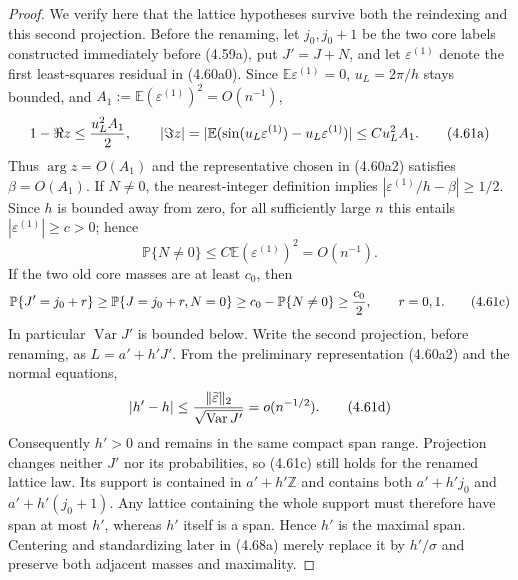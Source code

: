 \documentclass[11pt,a4paper]{article}
\numberwithin{equation}{section}
\theoremstyle{definition}
\theoremstyle{remark}
\newcommand{\E}{\mathbb E}
\newcommand{\Pp}{\mathbb P}
\begin{document}
\begin{proof}
We verify here that the lattice hypotheses survive both the reindexing and
this second projection.  Before the renaming, let $j_0,j_0+1$ be the two
core labels constructed immediately before (4.59a), put $J'=J+N$, and let
$\varepsilon^{(1)}$ denote
the first least-squares residual in (4.60a0).  Since
$\E\varepsilon^{(1)}=0$, $u_L=2\pi/h$ stays bounded, and
$A_1:=\E(\varepsilon^{(1)})^2=O(n^{-1})$,
\[
 1-\Re z\le {u_L^2A_1\over2},\qquad
 |\Im z|=|\E(\sin(u_L\varepsilon^{(1)})
                    -u_L\varepsilon^{(1)})|
       \le C u_L^2A_1.                                \tag{4.61a}
\]
Thus $\arg z=O(A_1)$ and the representative chosen in (4.60a2) satisfies
$\beta=O(A_1)$.  If $N\ne0$, the nearest-integer definition implies
$|\varepsilon^{(1)}/h-\beta|\ge1/2$.  Since $h$ is bounded away from
zero, for all sufficiently large $n$ this entails
$|\varepsilon^{(1)}|\ge c>0$; hence
\[
 \Pp\{N\ne0\}\le C\E(\varepsilon^{(1)})^2=O(n^{-1}). \tag{4.61b}
\]
If the two old core masses are at least $c_0$, then
\[
 \Pp\{J'=j_0+r\}\ge
 \Pp\{J=j_0+r,N=0\}\ge c_0-\Pp\{N\ne0\}
 \ge {c_0\over2},\qquad r=0,1.                        \tag{4.61c}
\]
In particular $\operatorname {Var}J'$ is bounded below.  Write the second projection,
before renaming, as $L=a'+h'J'$.  From the preliminary representation
(4.60a2) and the normal equations,
\[
 |h'-h|\le {\|\widetilde\varepsilon\|_2\over
                    \sqrt{\operatorname {Var}J'}}=o(n^{-1/2}).       \tag{4.61d}
\]
Consequently $h'>0$ and remains in the same compact span range.  Projection
changes neither $J'$ nor its probabilities, so (4.61c) still holds for the
renamed lattice law.  Its support is contained in $a'+h'\mathbb Z$ and
contains both $a'+h'j_0$ and $a'+h'(j_0+1)$.  Any lattice containing the
whole support must therefore have span at most $h'$, whereas $h'$ itself is
a span.  Hence $h'$ is the maximal span.  Centering and standardizing later
in (4.68a) merely replace it by $h'/\sigma$ and preserve both adjacent
masses and maximality.


\end{proof}
\end{document}
